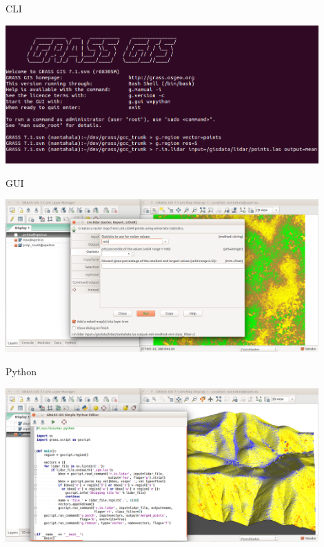 \documentclass[xcolor={dvipsnames,usenames},beamer,aspectratio=169]{beamer}
\begin{document}
\begin{frame}{CLI}

\begin{center}
  \includegraphics[width=0.9\textwidth]{grass/grass_cli}
\end{center}

\end{frame}

\begin{frame}{GUI}

\begin{center}
  \includegraphics[width=0.9\textwidth]{grass/r_in_lidar_gui}
\end{center}

\end{frame}

\begin{frame}{Python}

\begin{center}
  \includegraphics[width=0.9\textwidth]{grass/grass_pyedit}
\end{center}

\end{frame}
\end{document}
